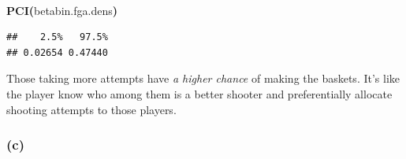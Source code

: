 \documentclass{article}
\makeatletter
\newcommand{\hlfunctioncall}[1]{\textcolor[rgb]{.5,0,.33}{\textbf{#1}}}%
\newcommand{\hlkeyword}[1]{\textbf{#1}}%
\newcommand{\hlsymbol}[1]{#1}%
\newcommand{\hlstd}[1]{\textcolor[rgb]{0,0,0}{#1}}%
\newenvironment{kframe}{%
 \def\FrameCommand##1{\hskip\@totalleftmargin \hskip-\fboxsep
 \colorbox{shadecolor}{##1}\hskip-\fboxsep
     \hskip-\linewidth \hskip-\@totalleftmargin \hskip\columnwidth}%
 \MakeFramed {\advance\hsize-\width
   \@totalleftmargin\z@ \linewidth\hsize
   \@setminipage}}%
 {\par\unskip\endMakeFramed}
\newenvironment{knitrout}{}{} %
\makeatother
\begin{document}
\begin{knitrout}
{\begin{kframe}
\begin{flushleft}
\ttfamily\noindent
\hspace*{\fill}\\
\hlstd{}\hlfunctioncall{PCI}\hlkeyword{(}\hlsymbol{betabin.fga.dens}\hlkeyword{)}\mbox{}
\normalfont
\end{flushleft}
\begin{verbatim}
##    2.5%   97.5% 
## 0.02654 0.47440 
\end{verbatim}
\end{kframe}}
\end{knitrout}


Those taking more attempts have {\em a higher chance} of making the baskets.
It's like the player know who among them is a better shooter and preferentially allocate shooting attempts to those players.

\subsubsection{(c)}
\end{document}
